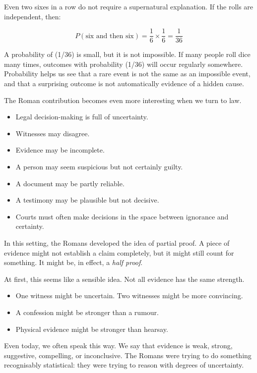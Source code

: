 \documentclass[
  letterpaper,
  DIV=11,
  numbers=noendperiod]{scrreprt}
\providecommand{\tightlist}{%
  \setlength{\itemsep}{0pt}\setlength{\parskip}{0pt}}
\begin{document}
Even two sixes in a row do not require a supernatural explanation. If
the rolls are independent, then:

\[P(\text{six and then six}) = \frac{1}{6} \times \frac{1}{6} = \frac{1}{36}\]

A probability of (1/36) is small, but it is not impossible. If many
people roll dice many times, outcomes with probability (1/36) will occur
regularly somewhere. Probability helps us see that a rare event is not
the same as an impossible event, and that a surprising outcome is not
automatically evidence of a hidden cause.

The Roman contribution becomes even more interesting when we turn to
law.

\begin{itemize}
\tightlist
\item
  Legal decision-making is full of uncertainty.
\item
  Witnesses may disagree.
\item
  Evidence may be incomplete.
\item
  A person may seem suspicious but not certainly guilty.
\item
  A document may be partly reliable.
\item
  A testimony may be plausible but not decisive.
\item
  Courts must often make decisions in the space between ignorance and
  certainty.
\end{itemize}

In this setting, the Romans developed the idea of partial proof. A piece
of evidence might not establish a claim completely, but it might still
count for something. It might be, in effect, a \emph{half proof}.

At first, this seems like a sensible idea. Not all evidence has the same
strength.

\begin{itemize}
\tightlist
\item
  One witness might be uncertain. Two witnesses might be more
  convincing.
\item
  A confession might be stronger than a rumour.
\item
  Physical evidence might be stronger than hearsay.
\end{itemize}

Even today, we often speak this way. We say that evidence is weak,
strong, suggestive, compelling, or inconclusive. The Romans were trying
to do something recognisably statistical: they were trying to reason
with degrees of uncertainty.
\end{document}
